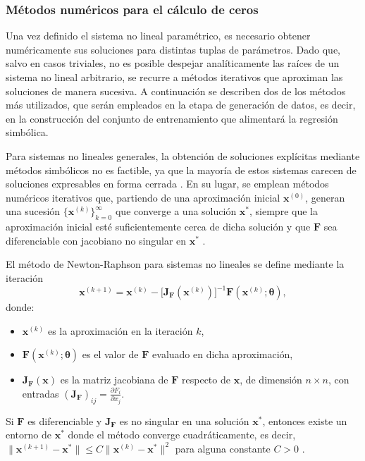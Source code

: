 \documentclass{article}
\newcommand{\xvec}{\mathbf{x}}
\newcommand{\thetavec}{\boldsymbol{\theta}}
\newcommand{\Fvec}{\mathbf{F}}
\newcommand{\jac}{\mathbf{J}}
\begin{document}
\subsubsection{Métodos numéricos para el cálculo de ceros}

Una vez definido el sistema no lineal paramétrico, es necesario obtener
numéricamente sus soluciones para distintas tuplas de parámetros. Dado
que, salvo en casos triviales, no es posible despejar analíticamente las
raíces de un sistema no lineal arbitrario, se recurre a métodos
iterativos que aproximan las soluciones de manera sucesiva. A
continuación se describen dos de los métodos más utilizados, que serán
empleados en la etapa de generación de datos, es decir, en la
construcción del conjunto de entrenamiento que alimentará la regresión
simbólica.

Para sistemas no lineales generales, la obtención de soluciones
explícitas mediante métodos simbólicos no es factible, ya que la mayoría
de estos sistemas carecen de soluciones expresables en forma cerrada
\cite{burden2010numerical}. En su lugar, se emplean métodos numéricos
iterativos que, partiendo de una aproximación inicial \(\xvec^{(0)}\),
generan una sucesión \(\{\xvec^{(k)}\}_{k=0}^{\infty}\) que converge a
una solución \(\xvec^*\), siempre que la aproximación inicial esté
suficientemente cerca de dicha solución y que \(\Fvec\) sea diferenciable
con jacobiano no singular en \(\xvec^*\) \cite{nocedal2006numerical}.

El método de Newton-Raphson para sistemas no lineales
\cite{burden2010numerical} se define mediante la iteración
\begin{equation}
\xvec^{(k+1)} = \xvec^{(k)} -
\bigl[\jac_{\Fvec}(\xvec^{(k)})\bigr]^{-1}
\Fvec(\xvec^{(k)}; \thetavec), \label{eq:newton}
\end{equation}
donde:
\begin{itemize}
    \item \(\xvec^{(k)}\) es la aproximación en la iteración \(k\),
    \item \(\Fvec(\xvec^{(k)}; \thetavec)\) es el valor de \(\Fvec\)
          evaluado en dicha aproximación,
    \item \(\jac_{\Fvec}(\xvec)\) es la matriz jacobiana de \(\Fvec\)
          respecto de \(\xvec\), de dimensión \(n \times n\), con entradas
          \((\jac_{\Fvec})_{ij} = \frac{\partial F_i}{\partial x_j}\).
\end{itemize}
Si \(\Fvec\) es diferenciable y \(\jac_{\Fvec}\) es no singular en una
solución \(\xvec^*\), entonces existe un entorno de \(\xvec^*\) donde el
método converge cuadráticamente, es decir,
\(\|\xvec^{(k+1)} - \xvec^*\| \le C \|\xvec^{(k)} - \xvec^*\|^2\) para
alguna constante \(C > 0\) \cite{nocedal2006numerical}.
\end{document}
